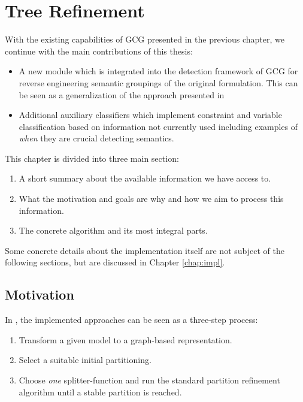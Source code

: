 \chapter{Tree Refinement}
\label{chap:tree}

	With the existing capabilities of \ac{GCG} presented in the previous chapter, we continue with the main contributions of this thesis:
	
	\begin{itemize}
		\item A new module which is integrated into the detection framework of \ac{GCG} for reverse engineering semantic groupings of the original formulation. This can be seen as a generalization of the approach presented in \cite{salvagninDetectingSemanticGroups2016}
		\item Additional auxiliary classifiers which implement constraint and variable classification based on information not currently used including examples of \textit{when} they are crucial detecting semantics.
	\end{itemize}

	This chapter is divided into three main section:
	
	\begin{enumerate}
		\item A short summary about the available information we have access to.
		\item What the motivation and goals are why and how we aim to process this information.
		\item The concrete algorithm and its most integral parts.
	\end{enumerate}
	
	Some concrete details about the implementation itself are not subject of the following sections, but are discussed in Chapter \ref{chap:impl}.

	\clearpage

	\section{Motivation}
	
		In \cite{salvagninDetectingSemanticGroups2016}, the implemented approaches can be seen as a three-step process:
		
		\begin{enumerate}
			\item Transform a given model to a graph-based representation.
			\item Select a suitable initial partitioning.
			\item Choose \textit{one} splitter-function and run the standard partition refinement algorithm until a stable partition is reached.
		\end{enumerate}
		
